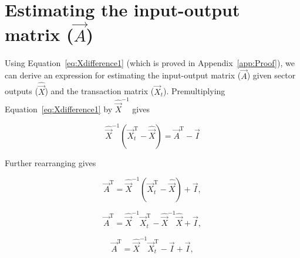 %
%
%

\chapter{Estimating the input-output matrix ($\vec{A}$)}
\label{chap:Estimating_A} 


Using Equation~\ref{eq:Xdifference1} (which is proved in Appendix~\ref{app:Proof}), 
we can derive an expression for estimating the input-output matrix ($\vec{A}$)
given sector outputs ($\hat{\vec{X}}$) and the transaction matrix ($\vec{X}_{t}$).
Premultiplying Equation~\ref{eq:Xdifference1} by $\hat{\vec{X}}^{-1}$ gives

\begin{equation} \label{eq:Xdifference1Proof-5}
	\hat{\vec{X}}^{-1}
	\left( 
		\vec{X}_{t}^\mathrm{T} 
		- \hat{\vec{X}} 
	\right)
	= \vec{A}^\mathrm{T} - \vec{I}
\end{equation}

\noindent{}Further rearranging gives

\begin{equation}\label{eq:Xdifference1Proof-6}
	\vec{A}^\mathrm{T} 
	= \hat{\vec{X}}^{-1}
	\left( 
		\vec{X}_{t}^\mathrm{T} 
		- \hat{\vec{X}} 
	\right)
	+ \vec{I},
\end{equation}

\begin{equation}\label{eq:Xdifference1Proof-7}
	\vec{A}^\mathrm{T} 
	= \hat{\vec{X}}^{-1} \vec{X}_{t}^\mathrm{T} 
	- \hat{\vec{X}}^{-1} \hat{\vec{X}}
	+ \vec{I},	
\end{equation}

\begin{equation}\label{eq:Xdifference1Proof-8}
	\vec{A}^\mathrm{T} 
	= \hat{\vec{X}}^{-1} \vec{X}_{t}^\mathrm{T} 
	- \vec{I}
	+ \vec{I},	
\end{equation}

